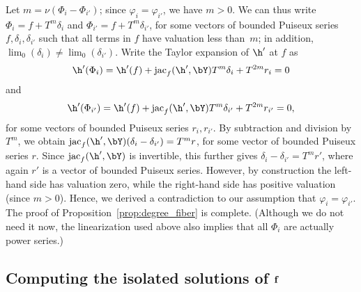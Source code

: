 \documentclass[12pt]{article}
\begin{document}
Let $m=\nu(\Phi_i-\Phi_{i'})$; since  $\varphi_i = \varphi_{i'}$, we have
$m > 0$. We can thus write $\Phi_i=f + T^m
\delta_i$ and $\Phi_{i'}=f + T^m \delta_{i'}$, for some vectors of
bounded Puiseux series $f, \delta_i, \delta_{i'}$ such that all terms
in $f$ have valuation less than~$m$; in addition, $\lim_0(\delta_i)
\ne \lim_0(\delta_{i'})$. Write the Taylor expansion of $\h'$ at $f$ as
$$\h'(\Phi_i) = \h'(f) + \jac_f(\h',\bY) T^m \delta_i + T^{2m} r_i =0$$
and
$$\h'(\Phi_{i'}) = \h'(f) + \jac_f(\h',\bY) T^m \delta_{i'} + T^{2m}
r_{i'} =0,$$ for some vectors of bounded Puiseux series $r_i,r_{i'}$.
By subtraction and division by $T^m$, we obtain $\jac_f(\h',\bY)
(\delta_i-\delta_{i'}) = T^m r$, for some vector of bounded Puiseux
series $r$.  Since $\jac_f(\h',\bY)$ is invertible, this further gives
$\delta_i-\delta_{i'} = T^m r'$, where again $r'$ is a vector of
bounded Puiseux series.  However, by construction the left-hand side
has valuation zero, while the right-hand side has positive valuation
(since $m > 0$). Hence, we derived a contradiction to our assumption
that $\varphi_i = \varphi_{i'}$. The proof of Proposition~\ref{prop:degree_fiber} is
complete. (Although we do not need it now, the linearization
used above also implies that all $\Phi_i$ are actually power series.)


\subsection{Computing the isolated solutions of $\mathbf{f}$} 
\end{document}
